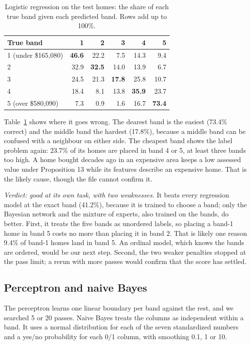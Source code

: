 \documentclass[sigconf,nonacm,10pt]{acmart}
\begin{document}
\begin{table}[t]
\caption{Logistic regression on the test homes: the share of each true band given each predicted band. Rows add up to 100\%.}
\label{tab:logistic-bands}
\small
\setlength{\tabcolsep}{4pt}
\begin{tabular}{@{}lrrrrr@{}}
\toprule
True band & 1 & 2 & 3 & 4 & 5 \\
\midrule
1 (under \$165,080) & \textbf{46.6} & 22.2 & 7.5 & 14.3 & 9.4 \\
2 & 32.9 & \textbf{32.5} & 14.0 & 13.9 & 6.7 \\
3 & 24.5 & 21.3 & \textbf{17.8} & 25.8 & 10.7 \\
4 & 18.4 & 8.1 & 13.8 & \textbf{35.9} & 23.7 \\
5 (over \$580,090) & 7.3 & 0.9 & 1.6 & 16.7 & \textbf{73.4} \\
\bottomrule
\end{tabular}
\end{table}

Table~\ref{tab:logistic-bands} shows where it goes wrong. The dearest band is the easiest (73.4\% correct) and the middle band the hardest (17.8\%), because a middle band can be confused with a neighbour on either side. The cheapest band shows the label problem again: 23.7\% of its homes are placed in band 4 or 5, at least three bands too high. A home bought decades ago in an expensive area keeps a low assessed value under Proposition 13 while its features describe an expensive home. That is the likely cause, though the file cannot confirm it.

\emph{Verdict: good at its own task, with two weaknesses.} It beats every regression model at the exact band (41.2\%), because it is trained to choose a band; only the Bayesian network and the mixture of experts, also trained on the bands, do better. First, it treats the five bands as unordered labels, so placing a band-1 home in band 5 costs no more than placing it in band 2. That is likely one reason 9.4\% of band-1 homes land in band 5. An ordinal model, which knows the bands are ordered, would be our next step. Second, the two weaker penalties stopped at the pass limit; a rerun with more passes would confirm that the score has settled.

\subsection{Perceptron and naive Bayes}
The perceptron \cite{rosenblatt1958} learns one linear boundary per band against the rest, and we searched 5 or 20 passes. Naive Bayes \cite{domingos1997} treats the columns as independent within a band. It uses a normal distribution for each of the seven standardized numbers and a yes/no probability for each 0/1 column, with smoothing 0.1, 1 or 10.
\end{document}
